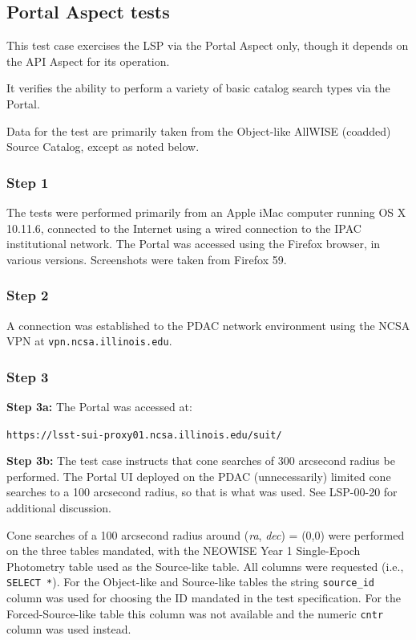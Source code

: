 
\subsection{Portal Aspect tests}

This test case exercises the LSP via the Portal Aspect only,
though it depends on the API Aspect for its operation.

It verifies the ability to perform a variety of basic catalog search types via the Portal.

Data for the test are primarily taken from the Object-like AllWISE (coadded) Source Catalog,
except as noted below.

\subsubsection{Step 1}

The tests were performed primarily from an Apple iMac computer running OS X 10.11.6,
connected to the Internet using a wired connection to the IPAC institutional network.
The Portal was accessed using the Firefox browser, in various versions.
Screenshots were taken from Firefox 59.

\subsubsection{Step 2}

A connection was established to the PDAC network environment using the NCSA VPN at \texttt{vpn.ncsa.illinois.edu}.

\subsubsection{Step 3}

\textbf{Step 3a:} The Portal was accessed at:

\begin{center}
\texttt{https://lsst-sui-proxy01.ncsa.illinois.edu/suit/}
\end{center}

\textbf{Step 3b:} The test case instructs that cone searches of 300 arcsecond radius be performed.
The Portal UI deployed on the PDAC (unnecessarily) limited cone searches to a 100 arcsecond radius,
so that is what was used.
See LSP-00-20 for additional discussion.

Cone searches of a 100 arcsecond radius around (\emph{ra}, \emph{dec}) = (0,0) were performed on the three tables mandated, with the NEOWISE Year 1 Single-Epoch Photometry table used as the Source-like table.
All columns were requested (i.e., \texttt{SELECT *}).
For the Object-like and Source-like tables the string \verb|source_id| column was used for choosing the ID mandated in the test specification.
For the Forced-Source-like table this column was not available and the numeric \verb|cntr| column was used instead.

